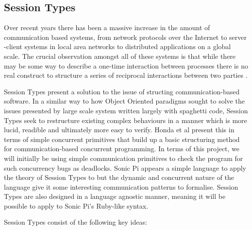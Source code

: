 \documentclass[11pt, abstracton, twoside]{scrartcl}
\begin{document}
\subsection{Session Types}
Over recent years there has been a massive increase in the amount of 
communication based systems, from network protocols over the Internet to server
-client systems in local area networks to distributed applications on a global 
scale. The crucial observation amongst all of these systems is that while 
there may be some way to describe a one-time interaction between processes 
there is no real construct to structure a series of reciprocal interactions 
between two parties \cite{HVM98}.

Session Types present a solution to the issue of structing communication-based 
software. In a similar way to how Object Oriented paradigms sought to solve 
the issues presented by large scale system written largely with spaghetti 
code, Session Types seek to restructure existing complex behaviours in a 
manner which is more lucid, readible and ultimately more easy to verify. Honda 
et al \cite{HVM98} present this in terms of simple concurrent primitives that 
build up a basic structuring method for communication-based concurrent 
programming. In terms of this project, we will initially be using simple 
communication primitives to check the program for such concurrency bugs as 
deadlocks. Sonic Pi appears a simple language to apply the theory of Session 
Types to but the dynamic and concurrent nature of the language give it some 
interesting communication patterns to formalise. Session Types 
are also designed in a language agnostic manner, meaning it will be possible to 
apply to Sonic Pi's Ruby-like syntax.

Session Types consist of the following key ideas:
\end{document}
